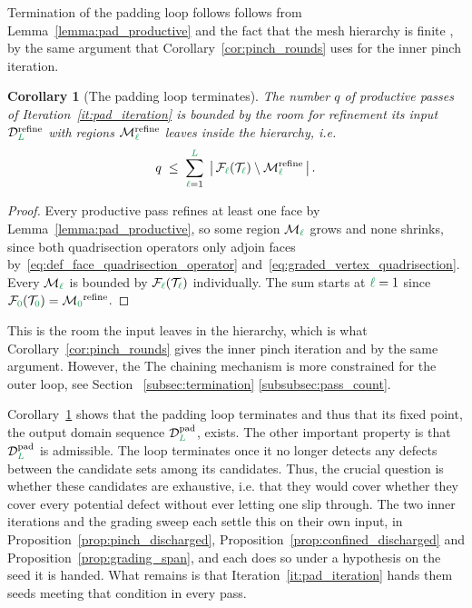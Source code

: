\documentclass[a4paper, 12pt]{article}
\makeatletter
\newcommand{\robert}[1]{{\color{orange} #1}}
\newcommand{\green}{\color{ForestGreen}}
\newcommand{\T}{\mathcal{T}}
\newcommand{\F}{\mathcal{F}}
\renewcommand{\l}{{\green\ell}}
\renewcommand{\L}{{\green L}}
\newcommand{\lzero}{{\green 0}}
\newcommand{\M}{\mathcal{M}}
\newtheorem{corollary}[theorem]{Corollary}
\theoremstyle{definition}
\theoremstyle{plain}
\numberwithin{equation}{section}
\newcommand{\tobecut}[1]{{\color{red} #1}}     %
\DeclareRobustCommand{\domseq}[1][]{\mathcal{D}\ifx\@empty#1\@empty\else_{#1}\fi}
\makeatother
\begin{document}
Termination of the padding loop follows \tobecut{follows} from Lemma~\ref{lemma:pad_productive} and the fact that the mesh hierarchy is finite\robert{, by the same argument that Corollary~\ref{cor:pinch_rounds} uses for the inner pinch iteration}.

\begin{corollary}[The padding loop terminates]
    \label{cor:pad_passes}
    The number $q$ of productive passes of Iteration~\ref{it:pad_iteration} is bounded by the room for refinement its input $\domseq[\L]^{\mathrm{refine}}$ with regions $\M^{\mathrm{refine}}_\l$ leaves inside the hierarchy, i.e.
    \begin{equation}
        \label{eq:pad_passes}
        q \; \leq \; \sum\limits_{\l = 1}^{\L} \; \big\vert \, \F_\l(\T_\l) \setminus \M^{\mathrm{refine}}_\l \, \big\vert \, .
    \end{equation}
\end{corollary}
\begin{proof}
    Every productive pass refines at least one face by Lemma~\ref{lemma:pad_productive}, so some region $\M_\l$ grows\robert{ and none shrinks, since both quadrisection operators only adjoin faces by~\eqref{eq:def_face_quadrisection_operator} and~\eqref{eq:graded_vertex_quadrisection}}. Every $\M_\l$ is bounded by $\F_\l(\T_\l)$ individually. The sum starts at $\l = 1$ since $\F_\lzero(\T_{\lzero}) = \M_\lzero^{\mathrm{refine}}$.
\end{proof}

\tobecut{This is the room the input leaves in the hierarchy, which is what Corollary~\ref{cor:pinch_rounds} gives the inner pinch iteration and by the same argument. However, the}\robert{The} chaining mechanism is more constrained for the outer loop, see Section~\tobecut{\ref{subsec:termination}}\robert{\ref{subsubsec:pass_count}}.

Corollary~\ref{cor:pad_passes} shows that the padding loop terminates and thus that its fixed point, the output domain sequence $\domseq[\L]^{\mathrm{pad}}$, exists. The other important property is that $\domseq[\L]^{\mathrm{pad}}$ is admissible. The loop terminates once it no longer detects any defects \tobecut{between the candidate sets}\robert{among its candidates}. Thus, the crucial question is whether these candidates are exhaustive, i.e. \tobecut{that they would cover}\robert{whether they cover} every potential defect without ever letting one slip through. The two inner iterations and the grading sweep each settle this on their own input, in Proposition~\ref{prop:pinch_discharged}, Proposition~\ref{prop:confined_discharged} and Proposition~\ref{prop:grading_span}, and each does so under a hypothesis on the seed it is handed. What remains is that Iteration~\ref{it:pad_iteration} hands them seeds meeting that condition in every pass.
\end{document}
